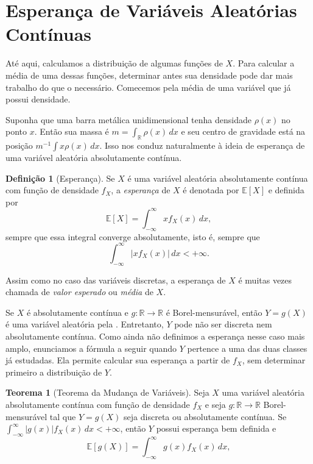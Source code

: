\documentclass[12pt,portuguese]{article}
\theoremstyle{definition}
\newtheorem{theorem}{Teorema}
\newtheorem{definition}[definition]{Definição}
\theoremstyle{plainexercise}
\theoremstyle{starredexercise}
\theoremstyle{definition}
\begin{document}
\section{Esperança de Variáveis Aleatórias Contínuas}\label{sec:esperanca-va-continuas}

Até aqui, calculamos a distribuição de algumas funções de $X$. Para
calcular a média de uma dessas funções, determinar antes sua densidade
pode dar mais trabalho do que o necessário. Comecemos pela média de uma
variável que já possui densidade.

Suponha que uma barra metálica unidimensional tenha densidade $\rho(x)$ no
ponto $x$. Então sua massa é $m = \int_{\mathbb{R}} \rho(x)\,dx$ e seu centro de
gravidade está na posição $m^{-1} \int x\rho(x)\,dx$. Isso nos conduz
naturalmente à ideia de esperança de uma variável aleatória absolutamente contínua.

\begin{definition}[Esperança]\label{def:esperanca-continua}
Se $X$ é uma variável aleatória absolutamente contínua com função de densidade $f_X$,
a \emph{esperança} de $X$ é denotada por $\mathbb{E}[X]$ e definida por
\begin{equation}\label{eq:def-esperanca-continua}
\mathbb{E}[X] = \int_{-\infty}^{\infty} x f_X(x)\,dx,
\end{equation}
sempre que essa integral converge absolutamente, isto é, sempre que
\[
\int_{-\infty}^{\infty}|x f_X(x)|\,dx<+\infty.
\]
\end{definition}

Assim como no caso das variáveis discretas, a esperança de $X$ é muitas
vezes chamada de \emph{valor esperado} ou \emph{média} de $X$.

Se $X$ é absolutamente contínua e $g:\mathbb{R}\to\mathbb{R}$ é
Borel-mensurável, então $Y=g(X)$ é uma variável aleatória pela
. Entretanto, $Y$ pode não ser discreta nem
absolutamente contínua. Como ainda não definimos a esperança nesse caso
mais amplo, enunciamos a fórmula a seguir quando $Y$ pertence a uma das
duas classes já estudadas. Ela permite calcular sua esperança a partir
de $f_X$, sem determinar primeiro a distribuição de $Y$.

\begin{theorem}[Teorema da Mudança de Variáveis]\label{thm:lotus-continuo}
  Seja $X$ uma variável aleatória absolutamente contínua com função de densidade $f_X$ e
  seja $g : \mathbb{R} \to \mathbb{R}$ Borel-mensurável tal que
  $Y=g(X)$ seja discreta ou absolutamente contínua. Se
  $\int_{-\infty}^{\infty}|g(x)|f_X(x)\,dx<+\infty$, então $Y$ possui
  esperança bem definida e
  \begin{equation}\label{eq:lotus-continuo}
    \mathbb{E}[g(X)] = \int_{-\infty}^{\infty} g(x) f_X(x)\,dx,
  \end{equation}
\end{theorem}
\end{document}
